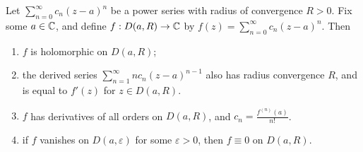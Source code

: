 \documentclass[a4paper]{scrartcl}
\begin{document}
\begin{theorem}
    Let $\sum_{n = 0}^{\infty} c_n(z - a)^n$ be a power series with radius of convergence $R > 0$. Fix some $a \in \mathbb{C}$, and define $f: D(a, R) \rightarrow \mathbb{C}$ by $f(z) = \sum_{n = 0}^{\infty} c_n(z - a)^n$. Then
    \begin{enumerate}[label=(\roman*)]
        \item $f$ is holomorphic on $D(a, R)$;
        \item the derived series $\sum_{n = 1}^{\infty} n c_n (z - a)^{n - 1}$ also has radius convergence $R$, and is equal to $f'(z)$ for $z \in D(a, R)$.
        \item $f$ has derivatives of all orders on $D(a, R)$, and $c_n = \frac{f^{(n)}(a)}{n!}$.
        \item if $f$ vanishes on $D(a, \varepsilon)$ for some $\varepsilon > 0$, then $f \equiv 0$ on $D(a, R)$.
    \end{enumerate}
\end{theorem}
\end{document}
